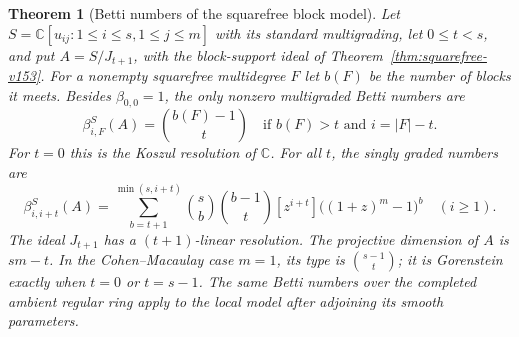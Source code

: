 \documentclass[11pt,reqno]{amsart}
\numberwithin{equation}{section}
\newtheorem{theorem}{Theorem}[section]
\theoremstyle{definition}\newtheorem{definition}[theorem]{Definition}
\theoremstyle{remark}\newtheorem{remark}[theorem]{Remark}
\newcommand{\C}{\mathbb C}\newcommand{\Q}{\mathbb Q}
\begin{document}
\begin{theorem}[Betti numbers of the squarefree block model]
\label{thm:block-betti-v154}
Let $S=\C[u_{ij}:1\leq i\leq s,1\leq j\leq m]$ with its standard
multigrading, let $0\leq t<s$, and put $A=S/J_{t+1}$, with the
block-support ideal of Theorem~\ref{thm:squarefree-v153}.
For a nonempty squarefree multidegree $F$ let $b(F)$ be the number
of blocks it meets. Besides $\beta_{0,0}=1$, the only nonzero
multigraded Betti numbers are
\begin{equation}\label{eq:block-multibetti-v154}
 \beta_{i,F}^S(A)=\binom{b(F)-1}{t}
       \quad\text{if }b(F)>t\text{ and }i=|F|-t.
\end{equation}
For $t=0$ this is the Koszul resolution of $\C$.
For all $t$, the singly graded numbers are
\begin{equation}\label{eq:block-betti-v154}
 \beta_{i,i+t}^S(A)=
 \sum_{b=t+1}^{\min(s,i+t)}\binom{s}{b}\binom{b-1}{t}
       [z^{i+t}]\big((1+z)^m-1\big)^b\quad(i\geq1).
\end{equation}
The ideal $J_{t+1}$ has a $(t+1)$-linear resolution. The projective
dimension of $A$ is $sm-t$. In the Cohen--Macaulay case $m=1$,
its type is $\binom{s-1}{t}$; it is Gorenstein exactly when
$t=0$ or $t=s-1$. The same Betti numbers over the completed ambient
regular ring apply to the local model after adjoining its smooth
parameters.
\end{theorem}
\end{document}
